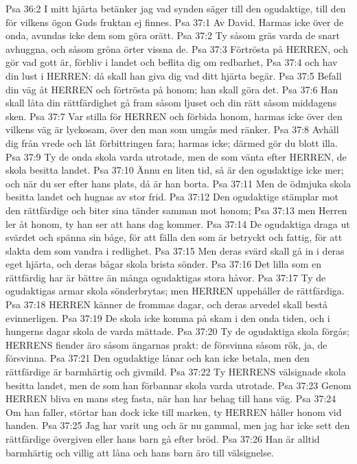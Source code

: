 Psa 36:2  I mitt hjärta betänker jag vad synden säger till den ogudaktige, till den för vilkens ögon Guds fruktan ej finnes.
Psa 37:1  Av David. Harmas icke över de onda, avundas icke dem som göra orätt.
Psa 37:2  Ty såsom gräs varda de snart avhuggna, och såsom gröna örter vissna de.
Psa 37:3  Förtrösta på HERREN, och gör vad gott är, förbliv i landet och beflita dig om redbarhet,
Psa 37:4  och hav din lust i HERREN: då skall han giva dig vad ditt hjärta begär.
Psa 37:5  Befall din väg åt HERREN och förtrösta på honom; han skall göra det.
Psa 37:6  Han skall låta din rättfärdighet gå fram såsom ljuset och din rätt såsom middagens sken.
Psa 37:7  Var stilla för HERREN och förbida honom, harmas icke över den vilkens väg är lyckosam, över den man som umgås med ränker.
Psa 37:8  Avhåll dig från vrede och låt förbittringen fara; harmas icke; därmed gör du blott illa.
Psa 37:9  Ty de onda skola varda utrotade, men de som vänta efter HERREN, de skola besitta landet.
Psa 37:10  Ännu en liten tid, så är den ogudaktige icke mer; och när du ser efter hans plats, då är han borta.
Psa 37:11  Men de ödmjuka skola besitta landet och hugnas av stor frid.
Psa 37:12  Den ogudaktige stämplar mot den rättfärdige och biter sina tänder samman mot honom;
Psa 37:13  men Herren ler åt honom, ty han ser att hans dag kommer.
Psa 37:14  De ogudaktiga draga ut svärdet och spänna sin båge, för att fälla den som är betryckt och fattig, för att slakta dem som vandra i redlighet.
Psa 37:15  Men deras svärd skall gå in i deras eget hjärta, och deras bågar skola brista sönder.
Psa 37:16  Det lilla som en rättfärdig har är bättre än många ogudaktigas stora håvor.
Psa 37:17  Ty de ogudaktigas armar skola sönderbrytas; men HERREN uppehåller de rättfärdiga.
Psa 37:18  HERREN känner de frommas dagar, och deras arvedel skall bestå evinnerligen.
Psa 37:19  De skola icke komma på skam i den onda tiden, och i hungerns dagar skola de varda mättade.
Psa 37:20  Ty de ogudaktiga skola förgås; HERRENS fiender äro såsom ängarnas prakt: de försvinna såsom rök, ja, de försvinna.
Psa 37:21  Den ogudaktige lånar och kan icke betala, men den rättfärdige är barmhärtig och givmild.
Psa 37:22  Ty HERRENS välsignade skola besitta landet, men de som han förbannar skola varda utrotade.
Psa 37:23  Genom HERREN bliva en mans steg fasta, när han har behag till hans väg.
Psa 37:24  Om han faller, störtar han dock icke till marken, ty HERREN håller honom vid handen.
Psa 37:25  Jag har varit ung och är nu gammal, men jag har icke sett den rättfärdige övergiven eller hans barn gå efter bröd.
Psa 37:26  Han är alltid barmhärtig och villig att låna och hans barn äro till välsignelse.
